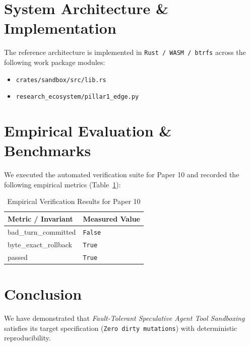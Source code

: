\documentclass[10pt,twocolumn]{article}
\begin{document}
\section{System Architecture \& Implementation}
The reference architecture is implemented in \texttt{Rust / WASM / btrfs} across the following work package modules:
\begin{itemize}
  \item \texttt{crates/sandbox/src/lib.rs}
  \item \texttt{research\_ecosystem/pillar1\_edge.py}
\end{itemize}

\section{Empirical Evaluation \& Benchmarks}
We executed the automated verification suite for Paper 10 and recorded the following empirical metrics (Table~\ref{tab:metrics}):

\begin{table}[htbp]
\centering
\caption{Empirical Verification Results for Paper 10}
\label{tab:metrics}
\begin{tabular}{ll}
\toprule
\textbf{Metric / Invariant} & \textbf{Measured Value} \\
\midrule
    bad\_turn\_committed & \texttt{False} \\
    byte\_exact\_rollback & \texttt{True} \\
    passed & \texttt{True} \\
\bottomrule
\end{tabular}
\end{table}

\section{Conclusion}
We have demonstrated that \textit{Fault-Tolerant Speculative Agent Tool Sandboxing} satisfies its target specification (\texttt{Zero dirty mutations}) with deterministic reproducibility.



\end{document}
